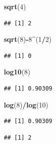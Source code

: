 \documentclass[]{book}
\newenvironment{Shaded}{\begin{snugshade}}{\end{snugshade}}
\newcommand{\CommentTok}[1]{\textcolor[rgb]{0.56,0.35,0.01}{\textit{#1}}}
\newcommand{\DecValTok}[1]{\textcolor[rgb]{0.00,0.00,0.81}{#1}}
\newcommand{\KeywordTok}[1]{\textcolor[rgb]{0.13,0.29,0.53}{\textbf{#1}}}
\newcommand{\NormalTok}[1]{#1}
\newcommand{\OperatorTok}[1]{\textcolor[rgb]{0.81,0.36,0.00}{\textbf{#1}}}
\theoremstyle{definition}
\theoremstyle{definition}
\theoremstyle{definition}
\theoremstyle{remark}
\begin{document}
\begin{Shaded}
\begin{Highlighting}[]
\KeywordTok{sqrt}\NormalTok{(}\DecValTok{4}\NormalTok{)}
\end{Highlighting}
\end{Shaded}

\begin{verbatim}
## [1] 2
\end{verbatim}

\begin{Shaded}
\begin{Highlighting}[]
\KeywordTok{sqrt}\NormalTok{(}\DecValTok{8}\NormalTok{)}\OperatorTok{-}\DecValTok{8}\OperatorTok{^}\NormalTok{(}\DecValTok{1}\OperatorTok{/}\DecValTok{2}\NormalTok{)}
\end{Highlighting}
\end{Shaded}

\begin{verbatim}
## [1] 0
\end{verbatim}

\begin{Shaded}
\begin{Highlighting}[]
\KeywordTok{log10}\NormalTok{(}\DecValTok{8}\NormalTok{)}
\end{Highlighting}
\end{Shaded}

\begin{verbatim}
## [1] 0.90309
\end{verbatim}

\begin{Shaded}
\begin{Highlighting}[]
\KeywordTok{log}\NormalTok{(}\DecValTok{8}\NormalTok{)}\OperatorTok{/}\KeywordTok{log}\NormalTok{(}\DecValTok{10}\NormalTok{)}
\end{Highlighting}
\end{Shaded}

\begin{verbatim}
## [1] 0.90309
\end{verbatim}

\begin{Shaded}
\end{Shaded}

\begin{verbatim}
## [1] 2
\end{verbatim}
\end{document}
